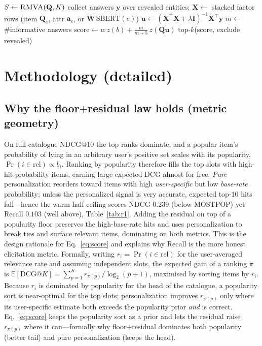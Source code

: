 \documentclass[11pt]{article}
\newcommand{\Q}{\mathbf{Q}}
\newcommand{\X}{\mathbf{X}}
\newcommand{\uu}{\mathbf{u}}
\newcommand{\yy}{\mathbf{y}}
\newcommand{\W}{\mathbf{W}}
\newcommand{\I}{\mathbf{I}}
\begin{document}
\begin{algorithm}[h]\small
\caption{Cold-start inference}
\begin{algorithmic}[1]
\State $S \gets \textsc{RMVA}(\Q,K)$ 
\State collect answers $\yy$ over revealed entities; $\X \gets$ stacked factor rows (item $\Q_e$, attr $\mathbf a_e$, or $\W\,\mathrm{SBERT}(e)$)
\State $\uu \gets (\X^\top\X+\lambda\I)^{-1}\X^\top\yy$ 
\State $m \gets$ \#informative answers
\State $\mathrm{score} \gets w\,z(b) + \tfrac{m}{m+5}\,z(\Q\uu)$
\State \Return top-$k$(score, exclude revealed)
\end{algorithmic}
\end{algorithm}

\section{Methodology (detailed)}\label{sec:method}

\subsection{Why the floor$+$residual law holds (metric geometry)}\label{sec:law}
On full-catalogue NDCG@10 the top ranks dominate, and a popular item's probability of lying in an arbitrary user's
positive set scales with its popularity, $\Pr(i\in\mathrm{rel})\propto b_i$. Ranking by popularity therefore fills
the top slots with high-hit-probability items, earning large expected DCG almost for free. \emph{Pure}
personalization reorders toward items with high \emph{user-specific} but low \emph{base-rate} probability; unless
the personalized signal is very accurate, expected top-$10$ hits fall---hence the warm-half ceiling scores NDCG
$0.239$ (below MOSTPOP) yet Recall $0.103$ (well above), Table~\ref{tab:r1}. Adding the residual on top of a
popularity floor preserves the high-base-rate hits and uses personalization to break ties and surface relevant
items, dominating on both metrics. This is the design rationale for Eq.~\eqref{eq:score} and explains why Recall
is the more honest elicitation metric. Formally, writing $r_i=\Pr(i\in\mathrm{rel})$ for the user-averaged
relevance rate and assuming independent slots, the expected gain of a ranking $\pi$ is
$\mathbb E[\mathrm{DCG@}K]=\sum_{p=1}^{K} r_{\pi(p)}/\log_2(p{+}1)$, maximised by sorting items by $r_i$. Because
$r_i$ is dominated by popularity for the head of the catalogue, a popularity sort is near-optimal for the top
slots; personalization improves $r_{\pi(p)}$ only where its user-specific estimate both exceeds the popularity
prior \emph{and} is correct. Eq.~\eqref{eq:score} keeps the popularity sort as a prior and lets the residual raise
$r_{\pi(p)}$ where it can---formally why floor$+$residual dominates both popularity (better tail) and pure
personalization (keeps the head).
\end{document}
